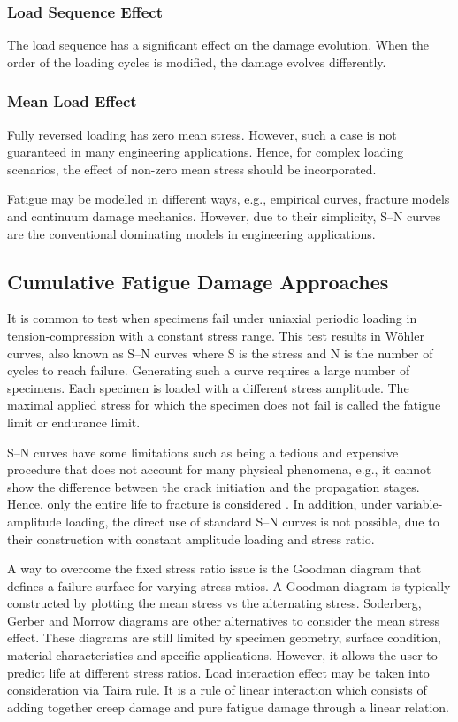 \subsubsection{Load Sequence Effect}
The load sequence has a significant effect on the damage evolution. When the order of the loading cycles is modified, the damage evolves differently.

\subsubsection{Mean Load Effect}
Fully reversed loading has zero mean stress. However, such a case is not guaranteed in many engineering applications. Hence, for complex loading scenarios, the effect of non-zero mean stress should be incorporated.

Fatigue may be modelled in different ways, e.g., empirical curves, fracture models and continuum damage mechanics. However, due to their simplicity, S--N curves are the conventional dominating models in engineering applications.

\subsection{Cumulative Fatigue Damage Approaches}

It is common to test when specimens fail under uniaxial periodic loading in tension-compression with a constant stress range. This test results in W{\"o}hler curves, also known as S--N curves where S is the stress and N is the number of cycles to reach failure. Generating such a curve requires a large number of specimens. Each specimen is loaded with a different stress amplitude. The maximal applied stress for which the specimen does not fail is called the fatigue limit or endurance limit.

S--N curves have some limitations such as being a tedious and expensive procedure that does not account for many physical phenomena, e.g., it cannot show the difference between the crack initiation and the propagation stages. Hence, only the entire life to fracture is considered \parencite{sobczyk2012random}. In addition, under variable-amplitude loading, the direct use of standard S--N curves is not possible, due to their construction with constant amplitude loading and stress ratio.

A way to overcome the fixed stress ratio issue is the Goodman diagram \parencite{lemaitre2005engineering} that defines a failure surface for varying stress ratios. A Goodman diagram is typically constructed by plotting the mean stress vs the alternating stress. Soderberg, Gerber and Morrow diagrams are other alternatives to consider the mean stress effect. These diagrams are still limited by specimen geometry, surface condition, material characteristics and specific applications. However, it allows the user to predict life at different stress ratios. Load interaction effect may be taken into consideration via Taira rule. It is a rule of linear interaction which consists of adding together creep damage and pure fatigue damage through a linear relation.

